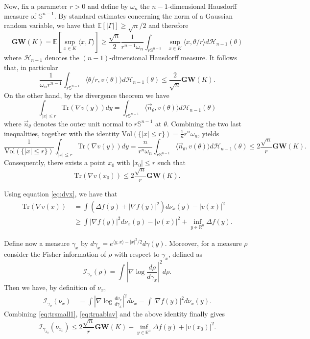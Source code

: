 \documentclass[12pt]{article}
\def \I{\mathcal{I}}
\def \Sph{\mathbb{S}^{n-1}}
\def \RR {\mathbb R}
\def \EE {\mathbb E}
\def \tr {\mathrm{Tr}}
\def \MW {\mathbf{GW}}
\theoremstyle{definition}
\theoremstyle{remark}
\begin{document}
Now, fix a parameter $r>0$ and define by $\omega_n$ the $n-1$-dimensional Hausdorff measure of $\Sph$. By standard estimates concerning the norm of a Gaussian random variable, we have that $\EE[|\Gamma|] \geq \sqrt{n}/2$ and therefore
$$
\MW(K) = \EE \left [ \sup_{x \in K} \langle x, \Gamma \rangle \right ] \geq \frac{\sqrt{n}}{2} \frac{1}{ r^{n-1} \omega_n } \int_{r \Sph} \sup_{x \in K} \langle x, \theta / r \rangle d \mathcal{H}_{n-1}(\theta)
$$
where $\mathcal{H}_{n-1}$ denotes the $(n-1)$-dimensional Hausdorff measure. It follows that, in particular
\begin{equation}\label{eq:meanw1}
\frac{1}{\omega_n r^{n-1}} \int_{r \Sph} \langle \theta / r, v(\theta) \rangle d \mathcal{H}_{n-1}(\theta) \leq \frac{2}{\sqrt{n}} \MW(K).
\end{equation}
On the other hand, by the divergence theorem we have
$$
\int_{|x| \leq r} \tr(\nabla v(y)) dy = \int_{r \Sph} \langle \vec{n}_\theta, v(\theta) \rangle d \mathcal{H}_{n-1}(\theta)
$$
where $\vec{n}_\theta$ denotes the outer unit normal to $r \Sph$ at $\theta$. Combining the two last inequalities, together with the identity $\mathrm{Vol}(\{|x| \leq r \}) = \tfrac{1}{n}r^{n} \omega_n$, yields
$$
\frac{1}{\mathrm{Vol}(\{|x| \leq r \})} \int_{|x| \leq r} \tr(\nabla v(y)) dy = \frac{n}{r^{n} \omega_n} \int_{r \Sph} \langle \vec{n}_\theta, v(\theta) \rangle d \mathcal{H}_{n-1}(\theta) \leq 2 \frac{\sqrt{n}}{r} \MW(K).
$$
Consequently, there exists a point $x_0$ with $|x_0| \leq r$ such that
\begin{equation}\label{eq:trsmall1}
\tr(\nabla v(x_0)) \leq 2 \frac{\sqrt{n}}{r} \MW(K).
\end{equation}

Using equation \eqref{eq:dvx}, we have that
\begin{align}
\tr \left (\nabla v(x) \right ) ~& = \int \left ( \Delta f(y) + |\nabla f(y)|^{2} \right ) d \nu_x(y) - |v(x)|^2  \nonumber \\
& \geq \int |\nabla f(y)|^2 d \nu_x(y) - |v(x)|^2 + \inf_{y \in \RR^n} \Delta f(y). \label{eq:trnablav}
\end{align}

Define now a measure $\gamma_x$ by $d \gamma_x = e^{\langle y,x \rangle - |x|^2/2} d \gamma(y)$. Moreover, for a measure $\rho$ consider the Fisher information of $\rho$ with respect to $\gamma_x$, defined as
$$
\I_{\gamma_x}(\rho) = \int \left |\nabla \log \frac{d \rho}{d \gamma_x} \right |^2 d \rho.
$$
Then we have, by definition of $\nu_x$,
\begin{align*}
\I_{\gamma_x} (\nu_x) ~& = \int \left  |\nabla \log \frac{d \nu_x}{d \gamma_x} \right |^2 d \nu_x  = \int \left  |\nabla f(y) \right |^2 d \nu_x(y).
\end{align*}
Combining \eqref{eq:trsmall1}, \eqref{eq:trnablav} and the above identity finally gives
$$
\I_{\gamma_{x_0}} (\nu_{x_0}) \leq 2 \frac{\sqrt{n}}{r} \MW(K) - \inf_{y \in \RR^n} \Delta f(y) + |v(x_0)|^2.
$$
\end{document}
